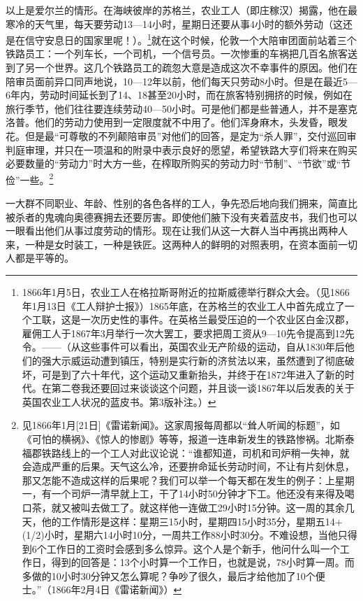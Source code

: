 \documentclass{ctexbook}
\begin{document}
    以上是爱尔兰的情形。在海峡彼岸的苏格兰，农业工人（即庄稼汉）揭露，他在最寒冷的天气里，每天要劳动13—14小时，星期日还要从事4小时的额外劳动（这还是在信守安息日的国家里呢！）。\footnote{1866年1月5日，农业工人在格拉斯哥附近的拉斯威德举行群众大会。（见1866年1月13日《工人辩护士报》）1865年底，在苏格兰的农业工人中首先成立了一个工联，这是一次历史性的事件。在英格兰最受压迫的一个农业区白金汉郡，雇佣工人于1867年3月举行一次大罢工，要求把周工资从9—10先令提高到12先令。——（从这些事件可以看出，英国农业无产阶级的运动，自从1830年后他们的强大示威运动遭到镇压，特别是实行新的济贫法以来，虽然遭到了彻底破坏，可是到了六十年代，这个运动又重新抬头，并终于在1872年进入了新的时代。在第二卷我还要回过来谈谈这个问题，并且谈一谈1867年以后发表的关于英国农业工人状况的蓝皮书。第3版补注。）}就在这个时候，伦敦一个大陪审团面前站着三个铁路员工：一个列车长，一个司机，一个信号员。一次惨重的车祸把几百名旅客送到了另一个世界。这几个铁路员工的疏忽大意是造成这次不幸事件的原因。他们在陪审员面前异口同声地说，10—12年以前，他们每天只劳动8小时。但是在最近5—6年内，劳动时间延长到了14、18甚至20小时，而在旅客特别拥挤的时候，例如在旅行季节，他们往往要连续劳动40—50小时。可是他们都是些普通人，并不是塞克洛普。他们的劳动力使用到一定限度就不中用了。他们浑身麻木，头发昏，眼发花。但是最“可尊敬的不列颠陪审员”对他们的回答，是定为“杀人罪”，交付巡回审判庭审理，并只在一项温和的附录中表示良好的愿望，希望铁路大亨们将来在购买必要数量的“劳动力”时大方一些，在榨取所购买的劳动力时“节制”、“节欲”或“节俭”一些。\footnote{见1866年1月[21日]《雷诺新闻》。这家周报每周都以“耸人听闻的标题”，如《可怕的横祸》、《惊人的惨剧》等等，报道一连串新发生的铁路惨祸。北斯泰福郡铁路线上的一个工人对此议论说：“谁都知道，司机和司炉稍一失神，就会造成严重的后果。天气这么冷，还要拚命延长劳动时间，不让有片刻休息，那又怎能不造成这样的后果呢？我们可以举一个每天都在发生的例子：上星期一，有一个司炉一清早就上工，干了14小时50分钟才下工。他还没有来得及喝口茶，就又被叫去做工了。就这样他一连做工29小时15分钟。这一周的其余几天，他的工作情形是这样：星期三15小时，星期四15小时35分，星期五14+(1/2)小时，星期六14小时10分，一周共工作88小时30分。不难设想，当他只得到6个工作日的工资时会感到多么惊异。这个人是个新手，他问什么叫一个工作日，得到的回答是：13个小时算一个工作日，也就是说，78小时算一周。而多做的10小时30分钟又怎么算呢？争吵了很久，最后才给他加了10个便士。”（1866年2月4日《雷诺新闻》）}

    一大群不同职业、年龄、性别的各色各样的工人，争先恐后地向我们拥来，简直比被杀者的鬼魂向奥德赛拥去还要厉害。即使他们腋下没有夹着蓝皮书，我们也可以一眼看出他们从事过度劳动的情形。现在让我们从这一大群人当中再挑出两种人来，一种是女时装工，一种是铁匠。这两种人的鲜明的对照表明，在资本面前一切人都是平等的。
\end{document}
